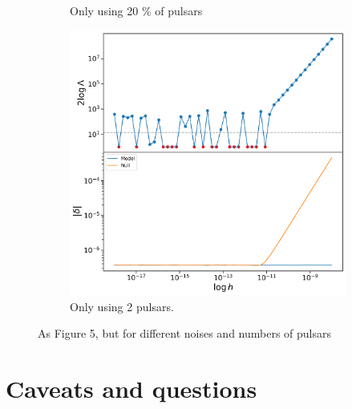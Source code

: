 \documentclass{tufte-handout} %
\begin{document}
\begin{figure}
\begin{subfigure}[b]{0.475\textwidth}
		\caption{Only using 20 \% of pulsars}  
		\label{fig:SNR2b}
	\end{subfigure}
	\hfill
	\begin{subfigure}[b]{0.475\textwidth}   
		\centering 
		\includegraphics[width=\textwidth]{images/SNR2_n2}
		\caption{Only using 2 pulsars.}   
		\label{fig:SNR2c}
	\end{subfigure}
	\caption{As Figure 5, but for different noises and numbers of pulsars}
	\label{SNR2}
\end{figure}



 
 \newpage 
 \section{Caveats and questions}
 
\end{document}
